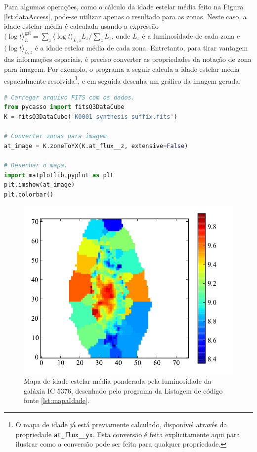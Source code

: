 
Para algumas operações, como o cálculo da idade estelar média feito na Figura
\ref{lst:dataAccess}, pode-se utilizar apenas o resultado para as zonas. Neste
caso, a idade estelar média é calculada usando a expressão $\langle \log t
\rangle^{\mathrm{gal}}_L = \sum_z \langle \log t \rangle_{L,z} L_z / \sum_z
L_z$, onde $L_z$ é a luminosidade de cada zona e $\langle \log t \rangle_{L,z}$
é a idade estelar média de cada zona. Entretanto, para tirar vantagem das
informações espaciais, é preciso converter as propriedades da notação de zona
para imagem.
Por exemplo, o programa a seguir calcula a idade estelar média espacialmente
resolvida\footnote{O mapa de idade já está previamente calculado, disponível
através da propriedade \texttt{at\_flux\_\_yx}. Esta conversão é feita
explicitamente aqui para ilustrar como a conversão pode ser feita para qualquer
propriedade.}, e em seguida desenha um gráfico da imagem gerada.

\begin{lstlisting}[language=Python, caption={Programa para desenhar o mapa de
idade estelar média ponderada pela luminosidade. O gráfico resultante é mostrado
na Figura \ref{fig:mapaIdade}.}, label={lst:mapaIdade}]
# Carregar arquivo FITS com os dados.
from pycasso import fitsQ3DataCube
K = fitsQ3DataCube('K0001_synthesis_suffix.fits')

# Converter zonas para imagem.
at_image = K.zoneToYX(K.at_flux__z, extensive=False)

# Desenhar o mapa.
import matplotlib.pyplot as plt
plt.imshow(at_image)
plt.colorbar()
\end{lstlisting}

\begin{figure}
	\includegraphics{figuras/mapa-idade}
	\caption[Mapa da idade estelar média da galáxia IC 5376] {Mapa de idade estelar
	média ponderada pela luminosidade da galáxia IC 5376, desenhado pelo programa
	da Listagem de código fonte \ref{lst:mapaIdade}.}
	\label{fig:mapaIdade}
\end{figure}

